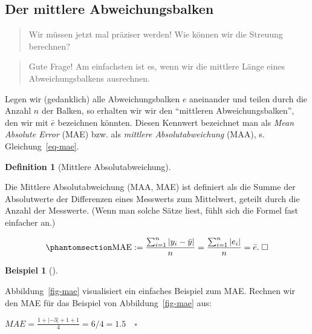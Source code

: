 \documentclass[
  letterpaper,
  oneside,
  open=any]{scrbook}
\theoremstyle{definition}
\theoremstyle{definition}
\newtheorem{example}{Beispiel}[chapter]
\theoremstyle{definition}
\newtheorem{definition}{Definition}[chapter]
\theoremstyle{remark}
\begin{document}
\subsection{Der mittlere
Abweichungsbalken}\label{der-mittlere-abweichungsbalken}

\begin{quote}
{} Wir müssen jetzt mal präziser werden! Wie können wir
die Streuung berechnen?
\end{quote}

\begin{quote}
{} Gute Frage! Am einfachsten ist es, wenn wir die
mittlere Länge eines Abweichungsbalkens ausrechnen.
\end{quote}

Legen wir (gedanklich) alle Abweichungsbalken \(e\) aneinander und
teilen durch die Anzahl \(n\) der Balken, so erhalten wir wir den
\enquote{mittleren Abweichungsbalken}, den wir mit \(\bar{e}\)
bezeichnen könnten. Diesen Kennwert bezeichnet man als \emph{Mean
Absolute Error} (MAE) bzw. als \emph{mittlere Absolutabweichung} (MAA),
s. Gleichung~\ref{eq-mae}.

\begin{definition}[Mittlere
Absolutabweichung]\protect\hypertarget{def-mae}{}\label{def-mae}

Die Mittlere Absolutabweichung (MAA, MAE) ist definiert als die Summe
der Absolutwerte der Differenzen eines Messwerts zum Mittelwert, geteilt
durch die Anzahl der Messwerte. (Wenn man solche Sätze liest, fühlt sich
die Formel fast einfacher an.)

\begin{equation}\phantomsection\label{eq-mae}{{\displaystyle \mathrm {MAE} :={\frac {\sum _{i=1}^{n}\left|y_{i}-\bar{y}\right|}{n}}={\frac {\sum _{i=1}^{n}\left|e_{i}\right|}{n}}=\bar{e}.  \; \square}}\end{equation}

\end{definition}

\begin{example}[]\protect\hypertarget{exm-mae}{}\label{exm-mae}

Abbildung~\ref{fig-mae} visualisiert ein einfaches Beispiel zum MAE.
Rechnen wir den MAE für das Beispiel von Abbildung~\ref{fig-mae} aus:

\(MAE = \frac{1 + |- 3| + 1 + 1}{4} = 6/4 = 1.5 \quad \square\)

\end{example}
\end{document}
